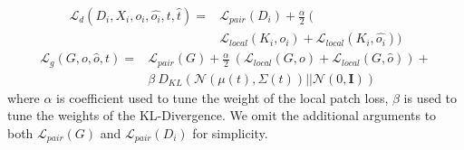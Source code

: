 \documentclass[10pt,twocolumn,letterpaper]{article}
\begin{document}
\begin{equation}
\label{equ:totalD}
\begin{split}
\mathcal{L}_{d}(D_i, X_i, o_i,\hat{o_i}, t, \hat{t})    = &\mathcal{L}_{pair}(D_i) + \frac{\alpha}{2}~( \\
&\mathcal{L}_{local}(K_i, o_i) + \mathcal{L}_{local}(K_i, \hat{o_i}) )
\end{split}
\end{equation}
\begin{equation}
\label{equ:totalG}
\begin{split}
\mathcal{L}_{g}(G,o,\hat{o}, t)  = &  \mathcal{L}_{pair}(G) + \frac{\alpha}{2}~(\mathcal{L}_{local}(G, o) + \mathcal{L}_{local}(G, \hat{o})) + \\
                  & \beta~D_{KL}(\mathcal{N}(\mu({t}), \Sigma({t}) )|| \mathcal{N}(0, \bm{I})) 
\end{split}
\end{equation}
where $\alpha$ is coefficient used to tune the weight of the local patch loss, $\beta$ is used to tune the weights of the KL-Divergence. 
We omit the additional arguments to both $\mathcal{L}_{pair}(G) $ and $\mathcal{L}_{pair}(D_i) $ for simplicity.
%
\end{document}
